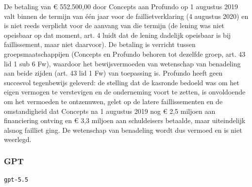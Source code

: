 \documentclass[
  dutch,
  a4paper,
]{article}
\begin{document}
De betaling van € 552.500,00 door Concepts aan Profundo op 1 augustus 2019 valt binnen de termijn van één jaar voor de faillietverklaring (4 augustus 2020) en is niet reeds verplicht voor de aanvang van die termijn (de lening was niet opeisbaar op dat moment, art. 4 luidt dat de lening dadelijk opeisbaar is bij faillissement, maar niet daarvoor). De betaling is verricht tussen groepsmaatschappijen (Concepts en Profundo behoren tot dezelfde groep, art. 43 lid 1 sub 6 Fw), waardoor het bewijsvermoeden van wetenschap van benadeling aan beide zijden (art. 43 lid 1 Fw) van toepassing is. Profundo heeft geen succesvol tegenbewijs geleverd: de stelling dat de kasronde bedoeld was om het eigen vermogen te verstevigen en de onderneming voort te zetten, is onvoldoende om het vermoeden te ontzenuwen, gelet op de latere faillissementen en de omstandigheid dat Concepts na 1 augustus 2019 nog € 2,5 miljoen aan financiering ontving en € 3,3 miljoen aan schuldeisers betaalde, maar uiteindelijk alsnog failliet ging. De wetenschap van benadeling wordt dus vermoed en is niet weerlegd.

\newpage


\subsubsection{GPT}\label{gpt-13}

\texttt{gpt-5.5}
\end{document}

